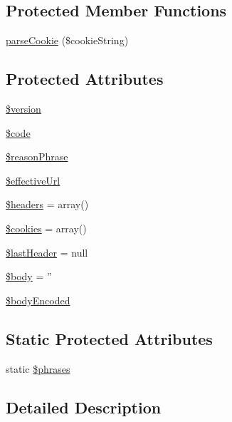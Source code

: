 \subsection*{Protected Member Functions}
\begin{DoxyCompactItemize}
\item 
\hyperlink{classHTTP__Request2__Response_a98d67c4a923e69edcfbca9233dd71a81}{parse\-Cookie} (\$cookie\-String)
\end{DoxyCompactItemize}
\subsection*{Protected Attributes}
\begin{DoxyCompactItemize}
\item 
\hyperlink{classHTTP__Request2__Response_aadbcb4df3711846a3b890c5492c4ffe7}{\$version}
\item 
\hyperlink{classHTTP__Request2__Response_a974eeb592b307dca6c7d02e0311832f5}{\$code}
\item 
\hyperlink{classHTTP__Request2__Response_ab9faa50ba9b9f208a02a7c4ce75b391a}{\$reason\-Phrase}
\item 
\hyperlink{classHTTP__Request2__Response_ab87ff3f614066accc95a6f29f23bc051}{\$effective\-Url}
\item 
\hyperlink{classHTTP__Request2__Response_a17017d7d7f6452267ba57ecd0e10fa35}{\$headers} = array()
\item 
\hyperlink{classHTTP__Request2__Response_af1d49532aaf677e27046fafff4f5e985}{\$cookies} = array()
\item 
\hyperlink{classHTTP__Request2__Response_adcf7a1e02f6e5d9eac767466f8551a1e}{\$last\-Header} = null
\item 
\hyperlink{classHTTP__Request2__Response_a3f5cdce9656ed7bd31859b5778169f66}{\$body} = ''
\item 
\hyperlink{classHTTP__Request2__Response_a1ab2bec927b0ac3d7cf82888479a4fea}{\$body\-Encoded}
\end{DoxyCompactItemize}
\subsection*{Static Protected Attributes}
\begin{DoxyCompactItemize}
\item 
static \hyperlink{classHTTP__Request2__Response_ad9a8fd735e8dc89eb7afc73750ec0bbc}{\$phrases}
\end{DoxyCompactItemize}


\subsection{Detailed Description}


